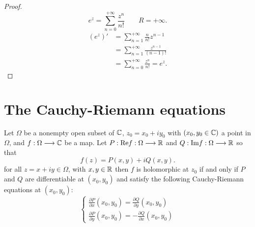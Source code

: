 \begin{proof}
  \[
  e^{z} = \sum_{n=0}^{+\infty} \frac{z^n }{n!}\quad \quad R = +\infty .
  \]
  \begin{align*}
    (e^{z}) ' &= \sum_{n=1}^{+\infty} 
    \frac{n}{n!}z^{n-1} \\
              &= \sum_{n=1}^{+\infty } 
              \frac{z^{n-1}}{(n-1) !} \\
              &= 
              \sum_{n=0}^{+\infty} \frac{z^{n}}{n!} = e^{z}.
  \end{align*}
\end{proof}
\section{The Cauchy-Riemann equations}
\begin{theorem}
  Let $\Omega $ be a nonempty open subset of $\mathbb{C}  $, $z_0 = x_0 + iy_0$ with $(x_0, y_0 \in  \mathbb{C})$ a point in 
  $\Omega $, and $ f : \Omega \longrightarrow \mathbb{C}  $ be a map. Let $ P : \text{Re} f : \Omega \longrightarrow \mathbb{R}  $ and
  $ Q : \text{Im}  f : \Omega\longrightarrow  \mathbb{R} $ so that 
  \[
  f(z)  = P(x, y)  + iQ(x, y).
  \]
  for all $z = x + iy \in  \Omega $, with $x, y \in  \mathbb{R}$ then $f $ is holomorphic at 
  $z_0 $ if and only if $P $ and $Q $ are differentiable at $(x_0, y_0)  $ and satisfy the following 
  Cauchy-Riemann equations at $(x_0, y_0):$ 
  \[
  \begin{cases}
    \frac{\partial P}{\partial x} (x_0, y_0)  = \frac{\partial Q}{\partial y} (x_0, y_0) \\
    \frac{\partial P}{\partial y} (x_0, y_0)  = - \frac{\partial Q}{\partial x} (x_0, y_0) 
  \end{cases}
  \]
\end{theorem}
